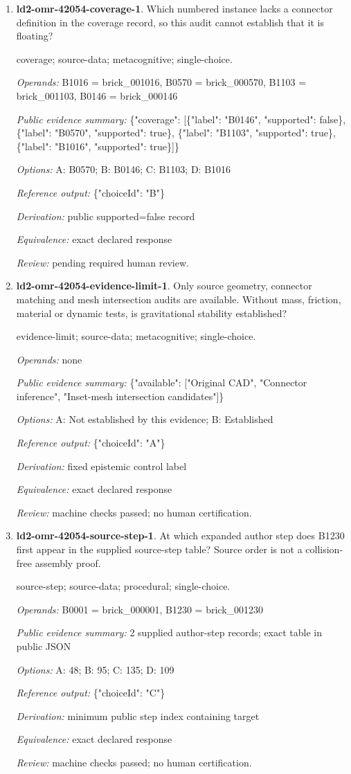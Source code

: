 \begin{enumerate}
\item \textbf{ld2-omr-42054-coverage-1}. Which numbered instance lacks a connector definition in the coverage record, so this audit cannot establish that it is floating?
\par{\small coverage; source-data; metacognitive; single-choice.\par\textit{Operands:} B1016 = brick\_001016, B0570 = brick\_000570, B1103 = brick\_001103, B0146 = brick\_000146\par\textit{Public evidence summary:} \{"coverage": [\{"label": "B0146", "supported": false\}, \{"label": "B0570", "supported": true\}, \{"label": "B1103", "supported": true\}, \{"label": "B1016", "supported": true\}]\}\par\textit{Options:} A: B0570; B: B0146; C: B1103; D: B1016\par\textit{Reference output:} \{"choiceId": "B"\}\par\textit{Derivation:} public supported=false record\par\textit{Equivalence:} exact declared response\par\textit{Review:} pending required human review.}
\item \textbf{ld2-omr-42054-evidence-limit-1}. Only source geometry, connector matching and mesh intersection audits are available. Without mass, friction, material or dynamic tests, is gravitational stability established?
\par{\small evidence-limit; source-data; metacognitive; single-choice.\par\textit{Operands:} none\par\textit{Public evidence summary:} \{"available": ["Original CAD", "Connector inference", "Inset-mesh intersection candidates"]\}\par\textit{Options:} A: Not established by this evidence; B: Established\par\textit{Reference output:} \{"choiceId": "A"\}\par\textit{Derivation:} fixed epistemic control label\par\textit{Equivalence:} exact declared response\par\textit{Review:} machine checks passed; no human certification.}
\item \textbf{ld2-omr-42054-source-step-1}. At which expanded author step does B1230 first appear in the supplied source-step table? Source order is not a collision-free assembly proof.
\par{\small source-step; source-data; procedural; single-choice.\par\textit{Operands:} B0001 = brick\_000001, B1230 = brick\_001230\par\textit{Public evidence summary:} 2 supplied author-step records; exact table in public JSON\par\textit{Options:} A: 48; B: 95; C: 135; D: 109\par\textit{Reference output:} \{"choiceId": "C"\}\par\textit{Derivation:} minimum public step index containing target\par\textit{Equivalence:} exact declared response\par\textit{Review:} machine checks passed; no human certification.}

\end{enumerate}
